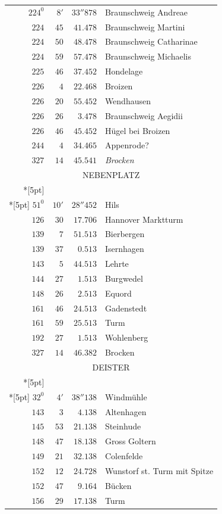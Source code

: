 \clearpage
{}%
\begingroup
\fontsize{10.5}{13}\selectfont
\setlength{\tabcolsep}{3pt}
\setlength{\LTpre}{2pt}
\setlength{\LTpost}{2pt}
\begin{longtable}{@{}rrrp{.61\linewidth}@{}}
\(224^{0}\)&\(8'\)&\(33''878\)&\raggedright Braunschweig Andreae\tabularnewline
\(224\)&\(45\)&\(41.478\)&\raggedright Braunschweig Martini\tabularnewline
\(224\)&\(50\)&\(48.478\)&\raggedright Braunschweig Catharinae\tabularnewline
\(224\)&\(59\)&\(57.478\)&\raggedright Braunschweig Michaelis\tabularnewline
\(225\)&\(46\)&\(37.452\)&\raggedright Hondelage\tabularnewline
\(226\)&\(4\)&\(22.468\)&\raggedright Broizen\tabularnewline
\(226\)&\(20\)&\(55.452\)&\raggedright Wendhausen\tabularnewline
\(226\)&\(26\)&\(3.478\)&\raggedright Braunschweig Aegidii\tabularnewline
\(226\)&\(46\)&\(45.452\)&\raggedright Hügel bei Broizen\tabularnewline
\(244\)&\(4\)&\(34.465\)&\raggedright Appenrode?\tabularnewline
\(327\)&\(14\)&\(45.541\)&\raggedright \textit{Brocken}\tabularnewline
\multicolumn{4}{c}{\strut NEBENPLATZ}\\*[5pt]
\multicolumn{4}{c}{\(-66001.465\)\qquad\(-23458.558\)}\\*[5pt]
\(51^{0}\)&\(10'\)&\(28''452\)&\raggedright Hils\tabularnewline
\(126\)&\(30\)&\(17.706\)&\raggedright Hannover Marktturm\tabularnewline
\(139\)&\(7\)&\(51.513\)&\raggedright Bierbergen\tabularnewline
\(139\)&\(37\)&\(0.513\)&\raggedright Isernhagen\tabularnewline
\(143\)&\(5\)&\(44.513\)&\raggedright Lehrte\tabularnewline
\(144\)&\(27\)&\(1.513\)&\raggedright Burgwedel\tabularnewline
\(148\)&\(26\)&\(2.513\)&\raggedright Equord\tabularnewline
\(161\)&\(46\)&\(24.513\)&\raggedright Gadenstedt\tabularnewline
\(161\)&\(59\)&\(25.513\)&\raggedright Turm\tabularnewline
\(192\)&\(27\)&\(1.513\)&\raggedright Wohlenberg\tabularnewline
\(327\)&\(14\)&\(46.382\)&\raggedright Brocken\tabularnewline
\multicolumn{4}{c}{\strut DEISTER}\\*[5pt]
\multicolumn{4}{c}{\(-78478.377\)\qquad\(+23444.173\)}\\*[5pt]
\(32^{0}\)&\(4'\)&\(38''138\)&\raggedright Windmühle\tabularnewline
\(143\)&\(3\)&\(4.138\)&\raggedright Altenhagen\tabularnewline
\(145\)&\(53\)&\(21.138\)&\raggedright Steinhude\tabularnewline
\(148\)&\(47\)&\(18.138\)&\raggedright Gross Goltern\tabularnewline
\(149\)&\(21\)&\(32.138\)&\raggedright Colenfelde\tabularnewline
\(152\)&\(12\)&\(24.728\)&\raggedright Wunstorf st. Turm mit Spitze\tabularnewline
\(152\)&\(47\)&\(9.164\)&\raggedright Bücken\tabularnewline
\(156\)&\(29\)&\(17.138\)&\raggedright Turm\tabularnewline

\end{longtable}
